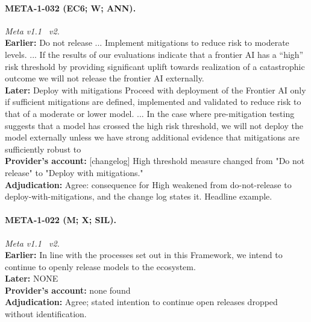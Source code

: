 \paragraph{META-1-032 (EC6; W; ANN).} \emph{Meta v1.1 \textrightarrow\ v2.}\\
\textbf{Earlier:} Do not release ... Implement mitigations to reduce risk to moderate levels. ... If the results of our evaluations indicate that a frontier AI has a ``high'' risk threshold by providing significant uplift towards realization of a catastrophic outcome we will not release the frontier AI externally.\\
\textbf{Later:} Deploy with mitigations Proceed with deployment of the Frontier AI only if sufficient mitigations are defined, implemented and validated to reduce risk to that of a moderate or lower model. ... In the case where pre-mitigation testing suggests that a model has crossed the high risk threshold, we will not deploy the model externally unless we have strong additional evidence that mitigations are sufficiently robust to \\
\textbf{Provider's account:} [changelog] High threshold measure changed from "Do not release" to "Deploy with mitigations."\\
\textbf{Adjudication:} Agree: consequence for High weakened from do-not-release to deploy-with-mitigations, and the change log states it. Headline example.

\paragraph{META-1-022 (M; X; SIL).} \emph{Meta v1.1 \textrightarrow\ v2.}\\
\textbf{Earlier:} In line with the processes set out in this Framework, we intend to continue to openly release models to the ecosystem.\\
\textbf{Later:} NONE\\
\textbf{Provider's account:} none found\\
\textbf{Adjudication:} Agree; stated intention to continue open releases dropped without identification.

